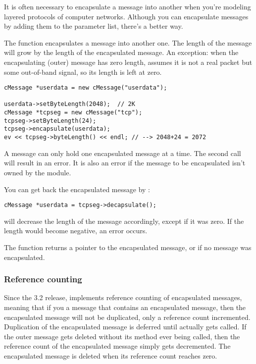 It is often necessary to encapsulate a
message into another when you're modeling
layered protocols of computer networks. Although you can encapsulate
messages by adding them to the parameter list, there's a better way.


The  function encapsulates a message
into another one. The length of the message will grow by the length of
the encapsulated message. An exception: when the encapsulating (outer)
message has zero length, {\opp} assumes it is not a real packet but
some out-of-band signal, so its length is left at zero.

\begin{verbatim}
cMessage *userdata = new cMessage("userdata");

userdata->setByteLength(2048);  // 2K
cMessage *tcpseg = new cMessage("tcp");
tcpseg->setByteLength(24);
tcpseg->encapsulate(userdata);
ev << tcpseg->byteLength() << endl; // --> 2048+24 = 2072
\end{verbatim}

A message can only hold one encapsulated message at a time. The
second  call will result in an error. It is also
an error if the message to be encapsulated isn't owned by the
module.

You can get back the encapsulated message by :

\begin{verbatim}
cMessage *userdata = tcpseg->decapsulate();
\end{verbatim}

 will decrease the length of the message accordingly,
except if it was zero. If the length would become negative, an
error occurs.

The  function returns a pointer to the encapsulated
message, or  if no message was encapsulated.

\subsubsection{Reference counting}

Since the 3.2 release, {\opp} implements reference counting of
encapsulated messages, meaning that if you  a message
that contains an encapsulated message, then the encapsulated message will
not be duplicated, only a reference count incremented. Duplication of
the encapsulated message is deferred until 
actually gets called. If the outer message gets deleted without its
 method ever being called, then the reference
count of the encapsulated message simply gets decremented. The
encapsulated message is deleted when its reference count reaches
zero.

